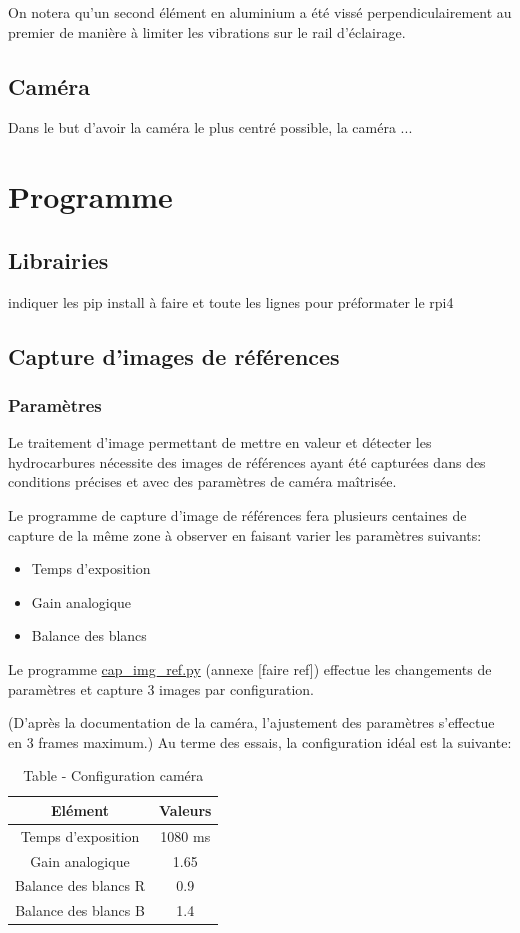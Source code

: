 On notera qu'un second élément en aluminium a été vissé perpendiculairement au premier de manière à limiter les vibrations sur le rail d'éclairage.

\subsection{Caméra}
Dans le but d'avoir la caméra le plus centré possible, la caméra ...
\section{Programme}
\subsection{Librairies}
indiquer les pip install à faire et toute les lignes pour préformater le rpi4
\subsection{Capture d'images de références}
\subsubsection{Paramètres}
Le traitement d'image permettant de mettre en valeur et détecter les hydrocarbures nécessite des images de références ayant été capturées dans des conditions précises et avec des paramètres de caméra maîtrisée.

Le programme de capture d'image de références fera plusieurs centaines de capture de la même zone à observer en faisant varier les paramètres suivants:
\begin{itemize}
    \item Temps d'exposition
    \item Gain analogique
    \item Balance des blancs
\end{itemize}

Le programme \underline{cap\_img\_ref.py} (annexe [faire ref]) effectue les changements de paramètres et capture 3 images par configuration.

(D'après la documentation de la caméra, l'ajustement des paramètres s'effectue en 3 frames maximum.)
Au terme des essais, la configuration idéal est la suivante:

\begin{table}[H]
    \begin{center}
        \caption{Table - Configuration caméra}
        \begin{tabular}{|c|c|}
            Elément              & Valeurs                 \\ \hline
            Temps d'exposition   & 1080 \si{\milli\second} \\
            Gain analogique      & 1.65                    \\
            Balance des blancs R & 0.9                     \\
            Balance des blancs B & 1.4                     \\
        \end{tabular}
    \end{center}
\end{table}

